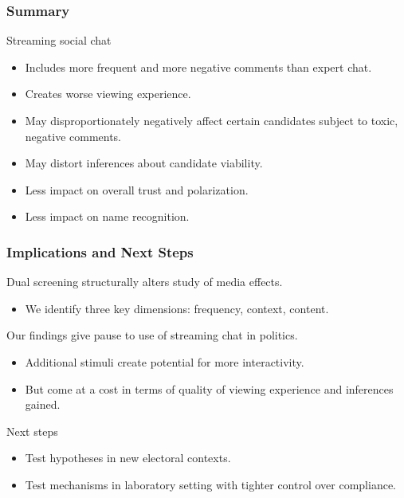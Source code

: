 \documentclass{beamer}
\begin{document}
\begin{frame}
\frametitle{Summary}

Streaming social chat 
\begin{itemize}
    \item Includes more frequent and more negative comments than expert chat.
\end{itemize}

\vspace{5mm}
\begin{itemize}
    \item Creates worse viewing experience.
    \item May disproportionately negatively affect certain candidates subject to toxic, negative comments.
    \item May distort inferences about candidate viability.
\end{itemize}

\vspace{5mm}
\begin{itemize}
    \item Less impact on overall trust and polarization.
    \item Less impact on name recognition.
\end{itemize}

\end{frame}

\begin{frame}
\frametitle{Implications and Next Steps}

Dual screening structurally alters study of media effects.
\begin{itemize}
    \item We identify three key dimensions: frequency, context, content.
\end{itemize}

\vspace{3mm}
Our findings give pause to use of streaming chat in politics.
\begin{itemize}
    \item Additional stimuli create potential for more interactivity.
    \item But come at a cost in terms of quality of viewing experience and inferences gained.
\end{itemize}


\vspace{3mm}
Next steps
\begin{itemize}
    \item Test hypotheses in new electoral contexts.
    \item Test mechanisms in laboratory setting with tighter control over compliance.
\end{itemize}



\end{frame}
\end{document}

